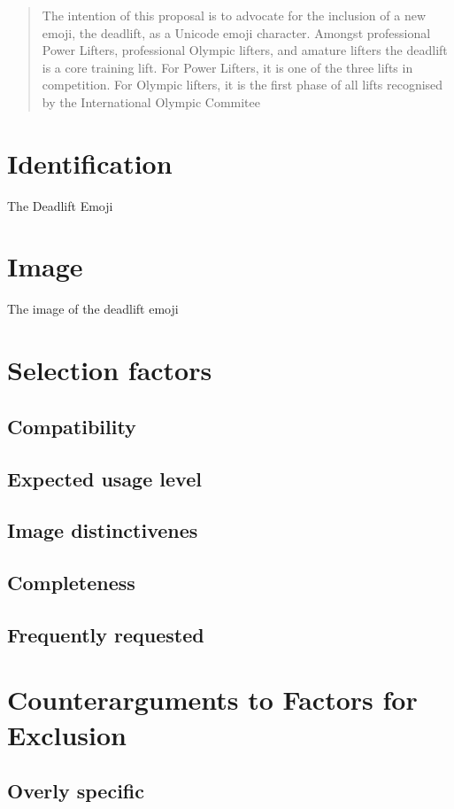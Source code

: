 \documentclass{article}
\begin{document}
\begin{abstract}
The intention of this proposal is to advocate for the inclusion of a new emoji, the deadlift, as a Unicode emoji character. 
Amongst professional Power Lifters, professional Olympic lifters, and amature lifters the deadlift is a core training lift. 
For Power Lifters, it is one of the three lifts in competition. For Olympic lifters, it is the first phase of all lifts recognised by the International Olympic Commitee
\end{abstract}
\section{Identification}
The Deadlift Emoji

\section{Image}
The image of the deadlift emoji

\section{Selection factors}
\subsection{Compatibility}
\subsection{Expected usage level}
\subsection{Image distinctivenes}
\subsection{Completeness}
\subsection{Frequently requested}

\section{Counterarguments to Factors for Exclusion}
\subsection{Overly specific}
\end{document}
